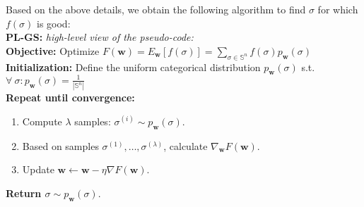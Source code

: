 \documentclass[a4paper,10pt]{article}
\newcommand{\ReplaceMe}[1]{{\color{blue}#1}}
\begin{document}
	
	


%
	
	Based on the above details, we obtain the following algorithm to find $\sigma$ for which $f(\sigma)$ is good:\\
	\textbf{PL-GS:} \textit{high-level view of the pseudo-code:} \\
	\textbf{Objective:} Optimize $F(\mathbf{w}) = E_\mathbf{w}[f(\sigma)] = \sum_{\sigma \in \mathbb{S}^n} f(\sigma) p_\mathbf{w}(\sigma)$ \\	
	\textbf{Initialization:} Define the uniform categorical distribution $p_\mathbf{w}(\sigma)$ s.t. $\forall~\sigma: p_\mathbf{w}(\sigma)=\frac{1}{|\mathbb{S}^n|}$ \\	
	\textbf{Repeat until convergence:}
	\begin{enumerate}
		\item Compute $\lambda$ samples: $\sigma^{(i)} \sim p_\mathbf{w}(\sigma)$.
		\item Based on samples $\sigma^{(1)}, \dots, \sigma^{(\lambda)}$, calculate $\nabla_{\mathbf{w}} F\left(\mathbf{w}\right)$.
		\item Update $\mathbf{w} \leftarrow \mathbf{w} - \eta \nabla F\left(\mathbf{w}\right)$.
	\end{enumerate}
	\textbf{Return $\sigma \sim p_\mathbf{w}(\sigma)$}.
	
\end{document}
